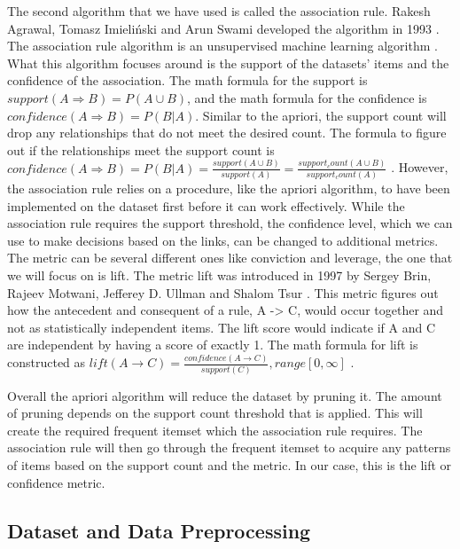 \documentclass[a4paper,10pt]{article}
\begin{document}
The second algorithm that we have used is called the association rule. Rakesh Agrawal, Tomasz Imieli{\'n}ski and Arun Swami developed the algorithm in 1993 \cite{agrawal1993mining}. The association rule algorithm is an unsupervised machine learning algorithm \cite{geron2019hands}. What this algorithm focuses around is the support of the datasets' items and the confidence of the association. The math formula for the support is $support(A \Rightarrow B) = P(A \cup B)$, and the math formula for the confidence is $confidence(A \Rightarrow B) = P(B|A)$.  Similar to the apriori, the support count will drop any relationships that do not meet the desired count. The formula to figure out if the relationships meet the support count is $confidence(A \Rightarrow B) = P(B|A) = \frac{support(A \cup B)}{support(A)} = \frac{support_count(A \cup B)}{support_count(A)}$ \cite{jingjingslides, han2011data}. However, the association rule relies on a procedure, like the apriori algorithm, to have been implemented on the dataset first before it can work effectively. While the association rule requires the support threshold, the confidence level, which we can use to make decisions based on the links, can be changed to additional metrics. The metric can be several different ones like conviction and leverage, the one that we will focus on is lift. The metric lift was introduced in 1997 by Sergey Brin, Rajeev Motwani, Jefferey D. Ullman and Shalom Tsur \cite{brin1997dynamic}. This metric figures out how the antecedent and consequent of a rule, A -> C, would occur together and not as statistically independent items. The lift score would indicate if A and C are independent by having a score of exactly 1. The math formula for lift is constructed as $lift(A \rightarrow C) = \frac{confidence(A \rightarrow C)}{support(C)}, range[0, \infty]$ \cite{brin1997dynamic, jingjingslides}.

Overall the apriori algorithm will reduce the dataset by pruning it. The amount of pruning depends on the support count threshold that is applied. This will create the required frequent itemset which the association rule requires. The association rule will then go through the frequent itemset to acquire any patterns of items based on the support count and the metric. In our case, this is the lift or confidence metric.

\subsection{Dataset and Data Preprocessing}
\end{document}
